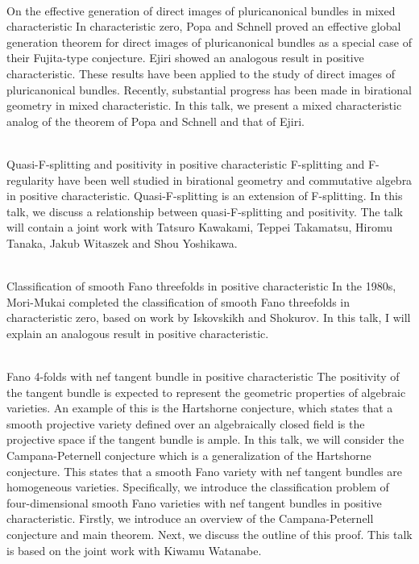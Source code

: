 \documentclass[dvipdfmx,a4paper,12pt]{article}
\theoremstyle{plain} %
\theoremstyle{definition} %
\begin{document}
\\
On the effective generation of direct images of pluricanonical bundles in mixed characteristic
\vskip3mm
In characteristic zero, Popa and Schnell proved an effective global generation theorem for direct images of pluricanonical bundles as a special case of their Fujita-type conjecture. Ejiri showed an analogous result in positive characteristic. These results have been applied to the study of direct images of pluricanonical bundles. Recently, substantial progress has been made in birational geometry in mixed characteristic. In this talk, we present a mixed characteristic analog of the theorem of Popa and Schnell and that of Ejiri.
\vskip6mm

\\
Quasi-F-splitting and positivity in positive characteristic
\vskip3mm
F-splitting and F-regularity have been well studied in birational geometry and commutative algebra in positive characteristic. Quasi-F-splitting is an extension of F-splitting.
In this talk, we discuss a relationship between quasi-F-splitting and positivity. The talk will contain a joint work with Tatsuro Kawakami, Teppei Takamatsu, Hiromu Tanaka, Jakub Witaszek and Shou Yoshikawa.
\vskip6mm

\\
Classification of smooth Fano threefolds in positive characteristic
\vskip3mm
In the 1980s, Mori-Mukai completed the classification of smooth Fano threefolds in characteristic zero, based on work by Iskovskikh and Shokurov. In this talk, I will explain an analogous result in positive characteristic.
\vskip6mm

\\
Fano 4-folds with nef tangent bundle in positive characteristic
\vskip3mm
The positivity of the tangent bundle is expected to represent the geometric properties of algebraic varieties. An example of this is the Hartshorne conjecture, which states that a smooth projective variety  defined over an algebraically closed field is the projective space if the tangent bundle is ample. In this talk, we will consider the Campana-Peternell conjecture which is a generalization of the Hartshorne conjecture. This states that a smooth Fano variety with nef tangent bundles are homogeneous varieties. Specifically, we introduce the classification problem of four-dimensional smooth Fano varieties with nef tangent bundles in positive characteristic. Firstly, we introduce an overview of the Campana-Peternell conjecture and main theorem. Next, we discuss the outline of this proof. This talk is based on the joint work with Kiwamu Watanabe.
\vskip6mm
\end{document}
